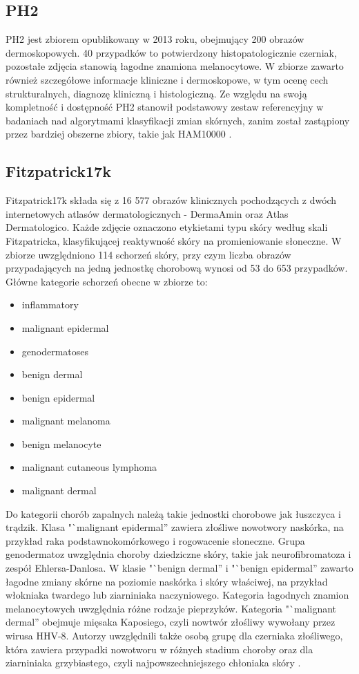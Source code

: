 \subsection{PH2}
PH2 jest zbiorem opublikowany w 2013 roku, obejmujący 200 obrazów dermoskopowych. 
40 przypadków to potwierdzony histopatologicznie czerniak, pozostałe zdjęcia stanowią łagodne znamiona melanocytowe.
W zbiorze zawarto również szczegółowe informacje kliniczne i dermoskopowe, w tym ocenę cech strukturalnych, diagnozę kliniczną i histologiczną.
Ze względu na swoją kompletność i dostępność PH2 stanowił podstawowy zestaw referencyjny w badaniach nad algorytmami klasyfikacji zmian skórnych, zanim został zastąpiony przez bardziej obszerne zbiory, takie jak HAM10000 \cite{Rozeira_2013}.

\subsection{Fitzpatrick17k}
Fitzpatrick17k składa się z 16 577 obrazów klinicznych pochodzących z dwóch internetowych atlasów dermatologicznych - DermaAmin oraz Atlas Dermatologico.
Każde zdjęcie oznaczono etykietami typu skóry według skali Fitzpatricka, klasyfikującej reaktywność skóry na promieniowanie słoneczne.
W zbiorze uwzględniono 114 schorzeń skóry, przy czym liczba obrazów przypadających na jedną jednostkę chorobową wynosi od 53 do 653 przypadków.
Główne kategorie schorzeń obecne w zbiorze to:
\begin{itemize}
	\item inflammatory
	\item malignant epidermal
	\item genodermatoses
	\item benign dermal
	\item benign epidermal
	\item malignant melanoma
	\item benign melanocyte
	\item malignant cutaneous lymphoma
	\item malignant dermal
\end{itemize}
Do kategorii chorób zapalnych należą takie jednostki chorobowe jak łuszczyca i trądzik.
Klasa "`malignant epidermal'' zawiera złośliwe nowotwory naskórka, na przykład raka podstawnokomórkowego i rogowacenie słoneczne.
Grupa genodermatoz uwzględnia choroby dziedziczne skóry, takie jak neurofibromatoza i zespół Ehlersa-Danlosa.
W klasie "`benign dermal'' i "`benign epidermal'' zawarto łagodne zmiany skórne na poziomie naskórka i skóry właściwej, na przykład włokniaka twardego lub ziarniniaka naczyniowego.
Kategoria łagodnych znamion melanocytowych uwzględnia różne rodzaje pieprzyków.
Kategoria "`malignant dermal'' obejmuje mięsaka Kaposiego, czyli nowtwór złośliwy wywołany przez wirusa HHV-8.
Autorzy uwzględnili także osobą grupę dla czerniaka złośliwego, która zawiera przypadki nowotworu w różnych stadium choroby oraz dla ziarniniaka grzybiastego, czyli najpowszechniejszego chłoniaka skóry \cite{groh2021evaluating, Schneider_Dittmer_2017, Bowman_Hogan_Sanusi_2001}.

